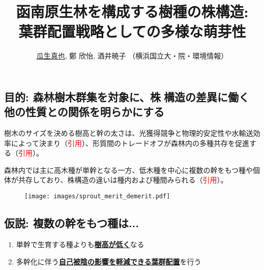 \documentclass[a0, 30pt, plainboxedsections]{sciposter} %
\title{\textcolor{Blue1}{函南原生林を構成する樹種の株構造:\\\vspace{-0.2em} 葉群配置戦略としての多様な萌芽性}}
\author{\underline{瓜生真也}, 鄭 欣怡, 酒井暁子 （横浜国立大・院・環境情報） \normalsize{\faEnvelope \hspace{0.02em} \fontspec{GillSans-Italic}{suika1127@gmail.com}}}
\begin{document}
\maketitle
\vspace{-2em}
\begin{mdframed}[style=section.frame]
  \centering\LARGE\textbf{\color{white}{はじめに}}
\end{mdframed}

\begin{multicols}{2}

\subsection*{目的: 森林樹木群集を対象に、株構造の差異に働く\\他の性質との関係を明らかにする}

樹木のサイズを決める樹高と幹の太さは、光獲得競争と物理的安定性や水輸送効率によって決まり（\textcolor{red}{引用}）、形質間のトレードオフが森林内の多種共存を促進する（\textcolor{red}{引用}）。

森林内では主に高木種が単幹となる一方、低木種を中心に複数の幹をもつ種や個体が共存しており、株構造の違いは種内および種間みられる（\textcolor{red}{引用}）。

\columnbreak
\begin{figure}
  \centering\texttt{[image: images/sprout\_merit\_demerit.pdf]}
\end{figure}

\subsection*{仮説: 複数の幹をもつ種は...}

\begin{enumerate}\setlength{\itemindent}{1em}
\item 単幹で生育する種よりも\underline{\textbf{樹高が低く}}なる
\item 多幹化に伴う\underline{\textbf{自己被陰の影響を軽減できる葉群配置}}を行う
\end{enumerate}
\end{multicols}
\begin{mdframed}[style=section.frame]
  \centering\LARGE\textbf{\color{white}{方法}}
\end{mdframed}
\end{document}
